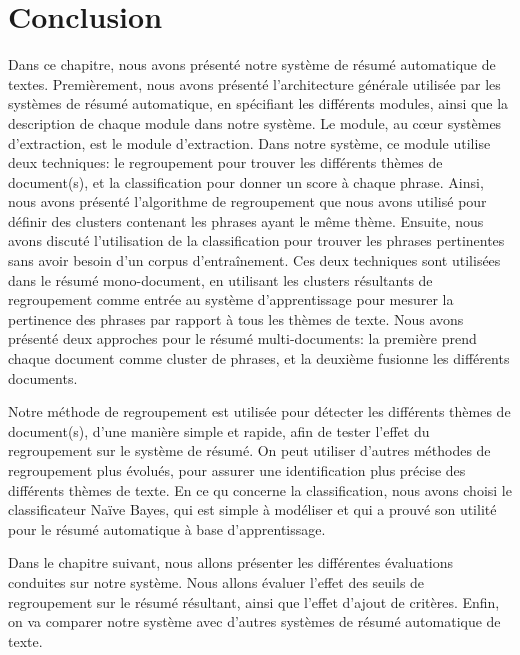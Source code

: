 \documentclass[a4paper,12pt,oneside]{../use/ESIthesis}
\begin{document}
\section{Conclusion}

Dans ce chapitre, nous avons présenté notre système de résumé automatique de textes. 
Premièrement, nous avons présenté l'architecture générale utilisée par les systèmes de résumé automatique, en spécifiant les différents modules, ainsi que la description de chaque module dans notre système.
Le module, au cœur systèmes d'extraction, est le module d'extraction. 
Dans notre système, ce module utilise deux techniques: le regroupement pour trouver les différents thèmes de document(s), et la classification pour donner un score à chaque phrase. 
Ainsi, nous avons présenté l'algorithme de regroupement que nous avons utilisé pour définir des clusters contenant les phrases ayant le même thème. 
Ensuite, nous avons discuté l'utilisation de la classification pour trouver les phrases pertinentes sans avoir besoin d'un corpus d'entraînement. 
Ces deux techniques sont utilisées dans le résumé mono-document, en utilisant les clusters résultants de regroupement comme entrée au système d'apprentissage pour mesurer la pertinence des phrases par rapport à tous les thèmes de texte. 
Nous avons présenté deux approches pour le résumé multi-documents: la première prend chaque document comme cluster de phrases, et la deuxième fusionne les différents documents. 

Notre méthode de regroupement est utilisée pour détecter les différents thèmes de document(s), d'une manière simple et rapide, afin de tester l'effet du regroupement sur le système de résumé. 
On peut utiliser d'autres méthodes de regroupement plus évolués, pour assurer une identification plus précise des différents thèmes de texte. 
En ce qu concerne la classification, nous avons choisi le classificateur Naïve Bayes, qui est simple à modéliser et qui a prouvé son utilité pour le résumé automatique à base d'apprentissage. 

Dans le chapitre suivant, nous allons présenter les différentes évaluations conduites sur notre système. 
Nous allons évaluer l'effet des seuils de regroupement sur le résumé résultant, ainsi que l'effet d'ajout de critères. 
Enfin, on va comparer notre système avec d'autres systèmes de résumé automatique de texte. 

\ifx\wholebook\relax\else
 \cleardoublepage
  
  
 
\end{document}
